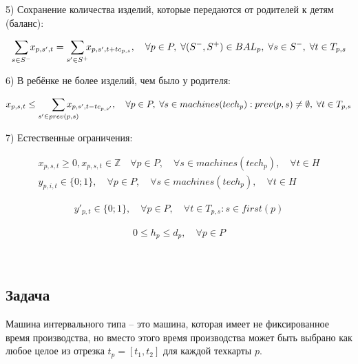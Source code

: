 \documentclass[14pt,fleqn]{extarticle}
\begin{document}
	5) Сохранение количества изделий, которые передаются от родителей к детям (баланс):
	
	\begin{ceqn}
		\begin{align*}
			\smashoperator[r]{\sum_{s \in S^{-}}} x_{p,s',t} = \smashoperator[r]{\sum_{s' \in S^{+}}} x_{p,s',t + tc_{p,s}}, \quad \forall p \in P, \; \forall (S^{-}, S^{+}) \in BAL_p, \; \forall s \in S^{-}, \; \forall t \in T_{p,s}
		\end{align*}
	\end{ceqn}

	6) В ребёнке не более изделий, чем было у родителя:
	
	\begin{ceqn}
		\begin{align*}
			x_{p,s,t} \leq \smashoperator[r]{\sum_{s' \in prev(p,s)}} x_{p,s',t-tc_{p,s'}}, \quad \forall p \in P, \; \forall s \in machines(tech_p): prev(p,s) \neq \emptyset, \; \forall t \in T_{p,s}
		\end{align*}
	\end{ceqn}

	7) Естественные ограничения:
	
	\begin{ceqn}
		\begin{align*}
			x_{p,s,t} \geq 0, x_{p,s,t} \in \mathbb{Z} \quad \forall p \in P, \quad \forall s \in machines(tech_p), \quad \forall t \in H\\
			y_{p,i,t} \in \{0; 1\}, \quad \forall p \in P, \quad \forall s \in machines(tech_p), \quad \forall t \in H
		\end{align*}
	\end{ceqn}

	\begin{ceqn}
		\begin{align*}
			y'_{p,t} \in \{0; 1\}, \quad \forall p \in P, \quad \forall t \in T_{p,s}: s \in first(p)
		\end{align*}
	\end{ceqn}

	\begin{ceqn}
		\begin{align*}
			0 \leq h_p \leq d_p, \quad \forall p \in P
		\end{align*}
	\end{ceqn}

	\noindent\makebox[\linewidth]{\rule{\paperwidth}{0.4pt}}\\
	
	\subsection*{Задача}
	Машина интервального типа -- это машина, которая имеет не фиксированное время производства, но вместо этого время производства может быть выбрано как любое целое из отрезка $t_p=[t_1, t_2]$ для каждой техкарты $p$.\\
	
\end{document}

